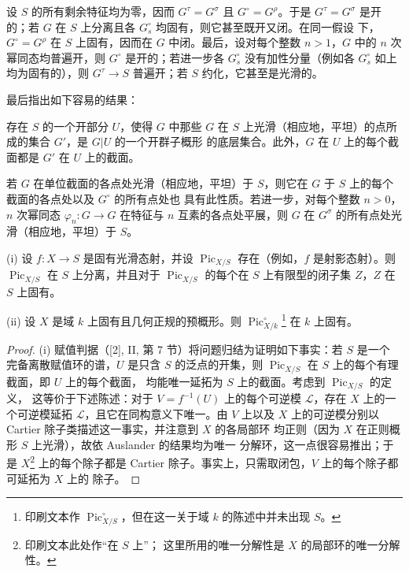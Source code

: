  设 $S$ 的所有剩余特征均为零，因而
$G^\tau=G^\sigma$ 且 $G^\circ=G^\rho$。于是 $G^\tau=G^\sigma$ 是开的；若
$G$ 在 $S$ 上分离且各 $G_s^\circ$ 均固有，则它甚至既开又闭。在同一假设
下，$G^\circ=G^\rho$ 在 $S$ 上固有，因而在 $G$ 中闭。最后，设对每个整数
$n>1$，$G$ 中的 $n$ 次幂同态均普遍开，则 $G^\circ$ 是开的；若进一步各
$G_s^\circ$ 没有加性分量（例如各 $G_s^\circ$ 如上均为固有的），则
$G^\tau\longrightarrow S$ 普遍开；若 $S$ 约化，它甚至是光滑的。

最后指出如下容易的结果：

 存在 $S$ 的一个开部分 $U$，使得 $G$ 中那些 $G$ 在
$S$ 上光滑（相应地，平坦）的点所成的集合 $G'$，是 $G|U$ 的一个开群子概形
的底层集合。此外，$G$ 在 $U$ 上的每个截面都是 $G'$ 在 $U$ 上的截面。

 若 $G$ 在单位截面的各点处光滑（相应地，平坦）于
$S$，则它在 $G$ 于 $S$ 上的每个截面的各点处以及 $G^\circ$ 的所有点处也
具有此性质。若进一步，对每个整数 $n>0$，$n$ 次幂同态
$\varphi_n:G\longrightarrow G$ 在特征与 $n$ 互素的各点处平展，则 $G$ 在
$G^\sigma$ 的所有点处光滑（相应地，平坦）于 $S$。



\noindent(i) 设 $f:X\longrightarrow S$ 是固有光滑态射，并设
$\operatorname{Pic}_{X/S}$ 存在（例如，$f$ 是射影态射）。则
$\operatorname{Pic}_{X/S}$ 在 $S$ 上分离，并且对于
$\operatorname{Pic}_{X/S}$ 的每个在 $S$ 上有限型的闭子集 $Z$，$Z$ 在
$S$ 上固有。

\noindent(ii) 设 $X$ 是域 $k$ 上固有且几何正规的预概形。则
$\operatorname{Pic}_{X/k}^\circ$\footnote{印刷文本作
$\operatorname{Pic}_{X/S}^\circ$，但在这一关于域 $k$ 的陈述中并未出现
$S$。} 在 $k$ 上固有。

\begin{proof}
(i) 赋值判据（[2], II, 第 7 节）将问题归结为证明如下事实：若 $S$ 是一个
完备离散赋值环的谱，$U$ 是只含 $S$ 的泛点的开集，则
$\operatorname{Pic}_{X/S}$ 在 $S$ 上的每个有理截面，即 $U$ 上的每个截面，
均能唯一延拓为 $S$ 上的截面。考虑到 $\operatorname{Pic}_{X/S}$ 的定义，
这等价于下述陈述：对于 $V=f^{-1}(U)$ 上的每个可逆模 $\mathcal L$，存在
$X$ 上的一个可逆模延拓 $\mathcal L$，且它在同构意义下唯一。由 $V$ 上以及
$X$ 上的可逆模分别以 Cartier 除子类描述这一事实，并注意到 $X$ 的各局部环
均正则（因为 $X$ 在正则概形 $S$ 上光滑），故依 Auslander 的结果均为唯一
分解环，这一点很容易推出；于是 $X$\footnote{印刷文本此处作“在 $S$ 上”；
这里所用的唯一分解性是 $X$ 的局部环的唯一分解性。} 上的每个除子都是
Cartier 除子。事实上，只需取闭包，$V$ 上的每个除子都可延拓为 $X$ 上的
除子。
\end{proof}

